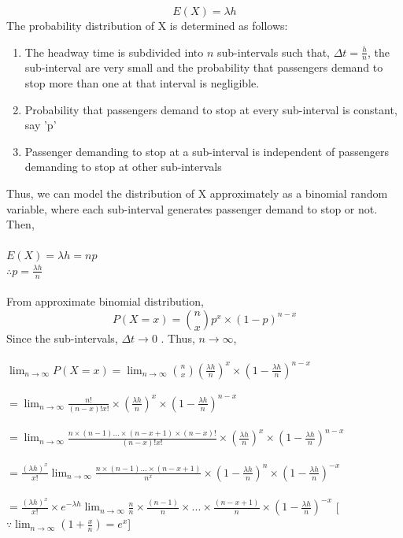 \begin{equation}
	E(X) = \lambda h
\end{equation}
The probability distribution of X is determined as follows:
\begin{enumerate}
	\item The headway time is subdivided into $ n $ sub-intervals such that, $ \Delta t = \frac{h}{n} $, the sub-interval are very small and the probability that passengers demand to stop more than one at that interval is negligible.
	\item Probability that passengers demand to stop at every sub-interval is constant, say 'p'
	\item Passenger demanding to stop at a sub-interval is independent of passengers demanding to stop at other sub-intervals
\end{enumerate}
Thus, we can model the distribution of X approximately as a binomial random variable, where each sub-interval generates passenger demand to stop or not. Then,\\\\
$ E(X) = \lambda h = np $\\
$ \therefore p = \frac{\lambda h}{n} $\\\\
From approximate binomial distribution,
$$ P(X = x) = \binom{n}{x} p^x \times (1-p)^{n-x} $$
Since the sub-intervals, $ \Delta t \to 0 $ . Thus, $ n \to \infty $,\\\\
$ \lim_{n \to \infty} P(X = x) = \lim_{n \to \infty} \binom{n}{x} (\frac{\lambda h}{n})^x \times (1 - \frac{\lambda h}{n})^{n-x} $\\\\
$ = \lim_{n \to \infty} \frac{n!}{(n-x)! x! } \times (\frac{\lambda h}{n})^x \times (1 - \frac{\lambda h}{n})^{n-x}  $\\\\
$ =  \lim_{n \to \infty} \frac{n\times (n-1)...\times (n-x+1)\times (n-x)!}{(n-x)! x!} \times (\frac{\lambda h}{n})^x \times (1 - \frac{\lambda h}{n})^{n-x}$\\\\
$ = \frac{(\lambda h)^x}{x!} \lim_{n \to \infty} \frac{n\times (n-1)...\times (n-x+1)}{n^x} \times (1 - \frac{\lambda h}{n})^n \times (1 - \frac{\lambda h}{n})^{-x} $\\\\
$  = \frac{(\lambda h)^x}{x!} \times e^{-\lambda h} \lim_{n \to \infty} \frac{n}{n} \times \frac{(n-1)}{n} \times...\times \frac{(n-x+1)}{n} \times (1 - \frac{\lambda h}{n})^{-x} $ [$ \because \lim_{n \to \infty} (1 + \frac{x}{n}) = e^x$] \\\\
